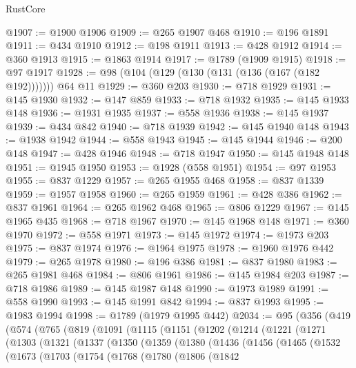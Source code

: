 \begin{lexlean}{RustCore}
\begin{coremodule}
@1907 := @1900 @1906
@1909 := @265 @1907 @468
@1910 := @196 @1891
@1911 := @434 @1910
@1912 := @198 @1911
@1913 := @428 @1912
@1914 := @360 @1913
@1915 := @1863 @1914
@1917 := @1789 (@1909 @1915)
@1918 := @97 @1917
@1928 := @98 (@104 (@129 (@130 (@131 (@136 (@167 (@182 @192))))))) @64 @11
@1929 := @360 @203
@1930 := @718 @1929
@1931 := @145 @1930
@1932 := @147 @859
@1933 := @718 @1932
@1935 := @145 @1933 @148
@1936 := @1931 @1935
@1937 := @558 @1936
@1938 := @145 @1937
@1939 := @434 @842
@1940 := @718 @1939
@1942 := @145 @1940 @148
@1943 := @1938 @1942
@1944 := @558 @1943
@1945 := @145 @1944
@1946 := @200 @148
@1947 := @428 @1946
@1948 := @718 @1947
@1950 := @145 @1948 @148
@1951 := @1945 @1950
@1953 := @1928 (@558 @1951)
@1954 := @97 @1953
@1955 := @837 @1229
@1957 := @265 @1955 @468
@1958 := @837 @1339
@1959 := @1957 @1958
@1960 := @265 @1959
@1961 := @428 @386
@1962 := @837 @1961
@1964 := @265 @1962 @468
@1965 := @806 @1229
@1967 := @145 @1965 @435
@1968 := @718 @1967
@1970 := @145 @1968 @148
@1971 := @360 @1970
@1972 := @558 @1971
@1973 := @145 @1972
@1974 := @1973 @203
@1975 := @837 @1974
@1976 := @1964 @1975
@1978 := @1960 @1976 @442
@1979 := @265 @1978
@1980 := @196 @386
@1981 := @837 @1980
@1983 := @265 @1981 @468
@1984 := @806 @1961
@1986 := @145 @1984 @203
@1987 := @718 @1986
@1989 := @145 @1987 @148
@1990 := @1973 @1989
@1991 := @558 @1990
@1993 := @145 @1991 @842
@1994 := @837 @1993
@1995 := @1983 @1994
@1998 := @1789 (@1979 @1995 @442)
@2034 := @95
    (@356
      (@419
        (@574
          (@765
            (@819
              (@1091
                (@1115
                  (@1151
                    (@1202
                      (@1214
                        (@1221
                          (@1271
                            (@1303
                              (@1321
                                (@1337
                                  (@1350
                                    (@1359
                                      (@1380
                                        (@1436
                                          (@1456
                                            (@1465
                                              (@1532
                                                (@1673
                                                  (@1703
                                                    (@1754
                                                      (@1768
                                                        (@1780
                                                          (@1806
                                                            (@1842

\end{coremodule}
\end{lexlean}
